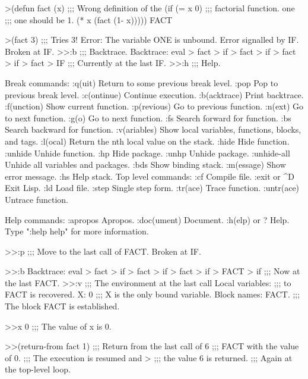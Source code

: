 \begin{example}
>(defun fact (x)                ;;;  Wrong definition of the 
   (if (= x 0)                  ;;;  factorial function. 
       one                      ;;;  one  should be  1. 
       (* x (fact (1- x)))))
FACT

>(fact 3)                       ;;;  Tries  3!
Error: The variable ONE is unbound.
Error signalled by IF.
Broken at IF.
>>:b                            ;;;  Backtrace. 
Backtrace: eval > fact > if > fact > if > fact > if > fact > IF
                                ;;;  Currently at the last  IF.
>>:h                            ;;;  Help. 

Break commands:
:q(uit)         Return to some previous break level.
:pop            Pop to previous break level.
:c(ontinue)     Continue execution.
:b(acktrace)    Print backtrace.
:f(unction)     Show current function.
:p(revious)     Go to previous function.
:n(ext)         Go to next function.
:g(o)           Go to next function.
:fs             Search forward for function.
:bs             Search backward for function.
:v(ariables)    Show local variables, functions, blocks, and tags.
:l(ocal)        Return the nth local value on the stack.
:hide           Hide function.
:unhide         Unhide function.
:hp             Hide package.
:unhp           Unhide package.
:unhide-all     Unhide all variables and packages.
:bds            Show binding stack.
:m(essage)      Show error message.
:hs             Help stack.
Top level commands:
:cf             Compile file.
:exit or ^D     Exit Lisp.
:ld             Load file.
:step           Single step form.
:tr(ace)        Trace function.
:untr(ace)      Untrace function.

Help commands:
:apropos        Apropos.
:doc(ument)     Document.
:h(elp) or ?    Help.  Type ":help help" for more information.

>>:p                        ;;;  Move to the last call of  FACT.
Broken at IF.

>>:b
Backtrace: eval > fact > if > fact > if > fact > if > FACT > if
                            ;;;  Now at the last  FACT.
>>:v                        ;;;  The environment at the last call 
Local variables:            ;;;  to  FACT  is recovered. 
  X: 0                      ;;;  X  is the only bound variable. 
Block names: FACT.          ;;;  The block  FACT  is established. 
                   
>>x
0                           ;;;  The value of  x  is  0.
        
>>(return-from fact 1)      ;;;  Return from the last call of 
6                           ;;;  FACT  with the value of  0.
                            ;;;  The execution is resumed and 
>                           ;;;  the value  6  is returned. 
                            ;;;  Again at the top-level loop. 
\end{example}

